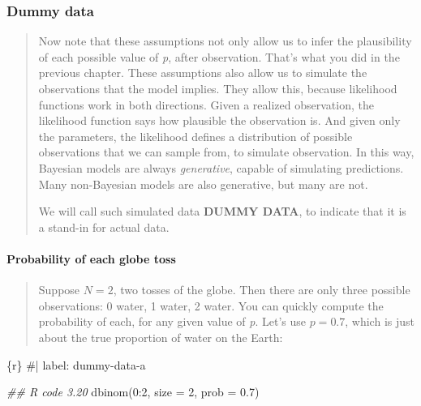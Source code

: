 \documentclass[
  letterpaper,
  DIV=11,
  numbers=noendperiod]{scrreprt}
\let\oldparagraph\paragraph
\renewcommand{\paragraph}[1]{\oldparagraph{#1}\mbox{}}
\newenvironment{Shaded}{\begin{snugshade}}{\end{snugshade}}
\newcommand{\AttributeTok}[1]{\textcolor[rgb]{0.40,0.45,0.13}{#1}}
\newcommand{\CommentTok}[1]{\textcolor[rgb]{0.37,0.37,0.37}{#1}}
\newcommand{\DecValTok}[1]{\textcolor[rgb]{0.68,0.00,0.00}{#1}}
\newcommand{\DocumentationTok}[1]{\textcolor[rgb]{0.37,0.37,0.37}{\textit{#1}}}
\newcommand{\FloatTok}[1]{\textcolor[rgb]{0.68,0.00,0.00}{#1}}
\newcommand{\FunctionTok}[1]{\textcolor[rgb]{0.28,0.35,0.67}{#1}}
\newcommand{\InformationTok}[1]{\textcolor[rgb]{0.37,0.37,0.37}{#1}}
\newcommand{\NormalTok}[1]{\textcolor[rgb]{0.00,0.23,0.31}{#1}}
\newcommand{\SpecialCharTok}[1]{\textcolor[rgb]{0.37,0.37,0.37}{#1}}
\begin{document}
\hypertarget{dummy-data}{%
\subsubsection{Dummy data}\label{dummy-data}}

\begin{quote}
Now note that these assumptions not only allow us to infer the
plausibility of each possible value of \emph{p}, after observation.
That's what you did in the previous chapter. These assumptions also
allow us to simulate the observations that the model implies. They allow
this, because likelihood functions work in both directions. Given a
realized observation, the likelihood function says how plausible the
observation is. And given only the parameters, the likelihood defines a
distribution of possible observations that we can sample from, to
simulate observation. In this way, Bayesian models are always
\emph{generative}, capable of simulating predictions. Many non-Bayesian
models are also generative, but many are not.

We will call such simulated data \textbf{DUMMY DATA}, to indicate that
it is a stand-in for actual data.
\end{quote}

\hypertarget{probability-of-each-globe-toss}{%
\paragraph{Probability of each globe
toss}\label{probability-of-each-globe-toss}}

\begin{quote}
Suppose \(N = 2\), two tosses of the globe. Then there are only three
possible observations: 0 water, 1 water, 2 water. You can quickly
compute the probability of each, for any given value of \emph{p}. Let's
use \(p = 0.7\), which is just about the true proportion of water on the
Earth:
\end{quote}

\begin{Shaded}
\begin{Highlighting}[]
\InformationTok{\textasciigrave{}\textasciigrave{}\textasciigrave{}\{r\}}
\CommentTok{\#| label: dummy{-}data{-}a}

\DocumentationTok{\#\# R code 3.20}
\FunctionTok{dbinom}\NormalTok{(}\DecValTok{0}\SpecialCharTok{:}\DecValTok{2}\NormalTok{, }\AttributeTok{size =} \DecValTok{2}\NormalTok{, }\AttributeTok{prob =} \FloatTok{0.7}\NormalTok{)}
\InformationTok{\textasciigrave{}\textasciigrave{}\textasciigrave{}}
\end{Highlighting}
\end{Shaded}
\end{document}
